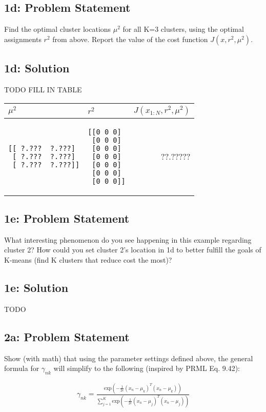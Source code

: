 \documentclass[10pt]{article}
\newcommand{\officialdirections}[1]{{\color{purple} #1}}
\begin{document}
\officialdirections{
\subsection*{1d: Problem Statement}
Find the optimal cluster locations $\mu^2$ for all K=3 clusters, using the optimal assignments $r^2$ from above. Report the value of the cost function $J(x,r^2,\mu^2)$.
}

\subsection{1d: Solution}
TODO FILL IN TABLE

\begin{tabular}{p{5cm} | p{5cm} | r}
$\mu^2$ & $r^2$ & $J(x_{1:N}, r^2, \mu^2)$
\\
\midrule
\begin{verbatim}
[[ ?.???  ?.???]
 [ ?.???  ?.???]
 [ ?.???  ?.???]]
\end{verbatim}
&	
\begin{verbatim}
[[0 0 0]
 [0 0 0]
 [0 0 0]
 [0 0 0]
 [0 0 0]
 [0 0 0]
 [0 0 0]]
\end{verbatim}
&
 ??.?????
\end{tabular}

\officialdirections{
\subsection*{1e: Problem Statement}
What interesting phenomenon do you see happening in this example regarding cluster 2? How could you set cluster 2's location in 1d to better fulfill the goals of K-means (find K clusters that reduce cost the most)?
}
\subsection{1e: Solution}

TODO


\officialdirections{
\subsection*{2a: Problem Statement}
Show (with math) that using the parameter settings defined above, the general formula for $\gamma_{nk}$ will simplify to the following (inspired by PRML Eq. 9.42):

\begin{align}
\gamma_{nk} = \frac
	{ \text{exp}( - \frac{1}{2\epsilon} (x_n - \mu_k)^T(x_n - \mu_k) )}
	{ \sum_{j=1}^K \text{exp}( - \frac{1}{2\epsilon} (x_n - \mu_j)^T (x_n - \mu_j) )}
\end{align}

}
\end{document}

